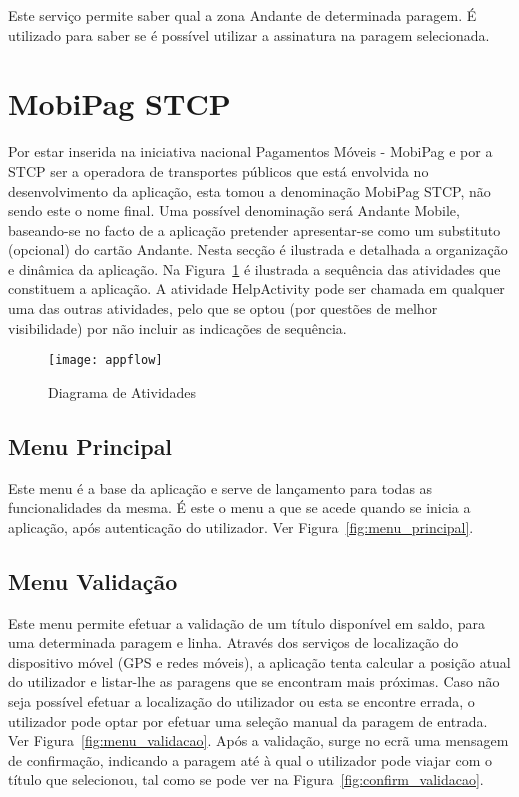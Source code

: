 Este serviço permite saber qual a zona Andante de determinada paragem. É utilizado para saber se é possível utilizar a assinatura na paragem selecionada.

\section{MobiPag STCP}

Por estar inserida na iniciativa nacional Pagamentos Móveis - MobiPag \cite{cedt} e por a STCP ser a operadora de transportes públicos que está envolvida no desenvolvimento da aplicação, esta tomou a denominação MobiPag STCP, não sendo este o nome final. Uma possível denominação será Andante Mobile, baseando-se no facto de a aplicação pretender apresentar-se como um substituto (opcional) do cartão Andante.
Nesta secção é ilustrada e detalhada a organização e dinâmica da aplicação. Na Figura~\ref{fig:appflow} é ilustrada a sequência das atividades que constituem a aplicação. A atividade HelpActivity pode ser chamada em qualquer uma das outras atividades, pelo que se optou (por questões de melhor visibilidade) por não incluir as indicações de sequência.

\begin{figure}[t]
  \begin{center}
    \leavevmode
    \texttt{[image: appflow]}
    \caption{Diagrama de Atividades}
    \label{fig:appflow}
  \end{center}
\end{figure}

\subsection{Menu Principal}

Este menu é a base da aplicação e serve de lançamento para todas as funcionalidades da mesma. É este o menu a que se acede quando se inicia a aplicação, após autenticação do utilizador. Ver Figura~\ref{fig:menu_principal}.

\subsection{Menu Validação}

Este menu permite efetuar a validação de um título disponível em saldo, para uma determinada paragem e linha. Através dos serviços de localização do dispositivo móvel (GPS e redes móveis), a aplicação tenta calcular a posição atual do utilizador e listar-lhe as paragens que se encontram mais próximas. Caso não seja possível efetuar a localização do utilizador ou esta se encontre errada, o utilizador pode optar por efetuar uma seleção manual da paragem de entrada. Ver Figura~\ref{fig:menu_validacao}. Após a validação, surge no ecrã uma mensagem de confirmação, indicando a paragem até à qual o utilizador pode viajar com o título que selecionou, tal como se pode ver na Figura~\ref{fig:confirm_validacao}.

